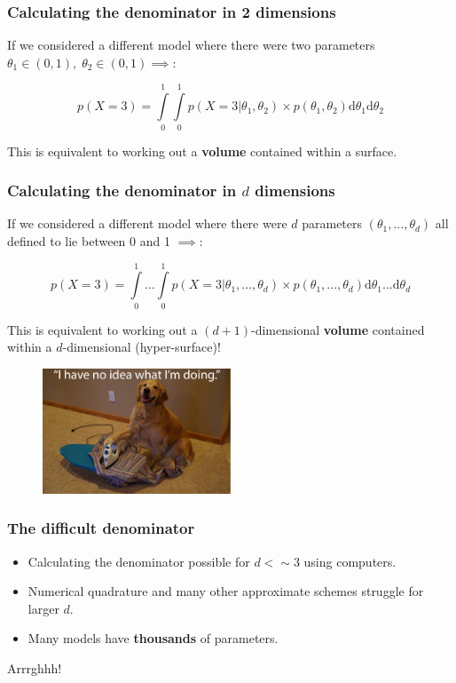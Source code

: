 \documentclass[handout]{beamer}
\begin{document}
\begin{frame}
	\frametitle{Calculating the denominator in 2 dimensions}
	 If we considered a different model where there were two parameters $\theta_1\in(0,1),\; \theta_2\in(0,1)  \implies$:
	
	
	\begin{equation}
	p(X=3) = \int\limits_{0}^{1} \int\limits_{0}^{1} p(X=3|\theta_1,\theta_2)\times p(\theta_1,\theta_2) \mathrm{d}\theta_1 \mathrm{d}\theta_2 
	\end{equation}
	
	 This is equivalent to working out a \textbf{volume} contained within a surface.
	
\end{frame}

\begin{frame}
	\frametitle{Calculating the denominator in $d$ dimensions}
	 If we considered a different model where there were $d$ parameters $(\theta_1,...,\theta_d)$ all defined to lie between 0 and 1 $\implies$:
	
	
	\begin{equation}
	p(X=3) = \int\limits_{0}^{1} ... \int\limits_{0}^{1} p(X=3|\theta_1,...,\theta_d)\times p(\theta_1,...,\theta_d) \mathrm{d}\theta_1...\mathrm{d}\theta_d
	\end{equation}
	
	 This is equivalent to working out a $(d+1)$-dimensional \textbf{volume} contained within a $d$-dimensional (hyper-surface)!
	
	\begin{figure}
		\centerline{\includegraphics[width=0.5\textwidth]{./figures/lec2_dogIroning.pdf}}
	\end{figure}
	
\end{frame}

\begin{frame}
	\frametitle{The difficult denominator}
	
	\begin{itemize}
		\item<2-> Calculating the denominator possible for $d < \sim 3$ using computers.
		\item<3-> Numerical quadrature and many other approximate schemes struggle for larger $d$.
		\item<4-> Many models have \textbf{thousands} of parameters.
	\end{itemize}
	
	\Large Arrrghhh!
	
\end{frame}
\end{document}
